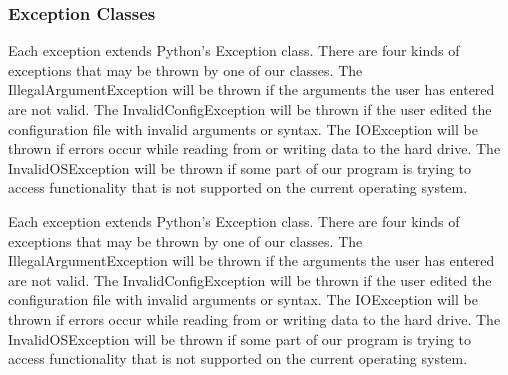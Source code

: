 \documentclass[parskip=full]{scrartcl}
\begin{document}
\subsubsection{Exception Classes}

Each exception extends Python's Exception class.
There are four kinds of exceptions that may be thrown by one of our classes.\newline\newline
The IllegalArgumentException will be thrown if the arguments the user has entered are not valid.\newline\newline
The InvalidConfigException will be thrown if the user edited the configuration file with invalid arguments or syntax.\newline\newline
The IOException will be thrown if errors occur while reading from or writing data to the hard drive.\newline\newline
The InvalidOSException will be thrown if some part of our program is trying to access functionality that is not supported on the current operating system.


\newpage
\begin{figure}[h]
\begin{center}


\label{Exception Classes}
\end{center}
\end{figure}
\newpage

Each \gls{exception} extends Python's Exception class.
There are four kinds of \glspl{exception} that may be thrown by one of our classes.\newline\newline
The IllegalArgumentException will be thrown if the arguments the user has entered are not valid.\newline\newline
The InvalidConfigException will be thrown if the user edited the configuration file with invalid arguments or syntax.\newline\newline
The IOException will be thrown if errors occur while reading from or writing data to the hard drive.\newline\newline
The InvalidOSException will be thrown if some part of our program is trying to access functionality that is not supported on the current operating system.
\end{document}
